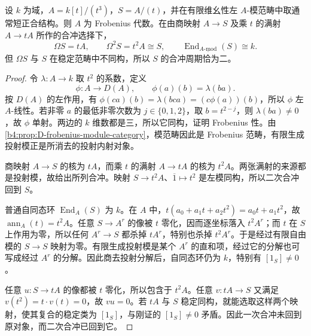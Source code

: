 \begin{proposition}\label{b4:prop:D-truncated-cubic-period}
	设 \(k\) 为域，\(A=k[t]/(t^3)\)，\(S=A/(t)\)，并在有限维幺性左 \(A\)-模范畴中取通常短正合结构。则 \(A\) 为 Frobenius 代数。在由商映射 \(A\to S\) 及乘 \(t\) 的满射 \(A\to tA\) 所作的合冲选择下，
	\[
		\Omega S=tA,\qquad \Omega^2S=t^2A\cong S, \qquad \operatorname{End}_{\underline{A\text{-}\mathrm{mod}}}(S)\cong k.
	\]
	但 \(\Omega S\) 与 \(S\) 在稳定范畴中不同构，所以 \(S\) 的合冲周期恰为二。
\end{proposition}
\begin{proof}
	令 \(\lambda:A\to k\) 取 \(t^2\) 的系数，定义
	\[
		\phi:A\longrightarrow D(A),\qquad \phi(a)(b)=\lambda(ba).
	\]
	按 \(D(A)\) 的左作用，有 \(\phi(ca)(b)=\lambda(bca)=(c\phi(a))(b)\)，所以 \(\phi\) 左 \(A\)-线性。若非零 \(a\) 的最低非零次数为 \(j\in\{0,1,2\}\)，取 \(b=t^{2-j}\)，则 \(\lambda(ba)\ne0\)，故 \(\phi\) 单射。两边的 \(k\) 维数都是三，所以它同构，证明 Frobenius 性。由\cref{b4:prop:D-frobenius-module-category}，模范畴因此是 Frobenius 范畴，有限生成投射模正是所消去的投射内射对象。

	商映射 \(A\to S\) 的核为 \(tA\)，而乘 \(t\) 的满射 \(A\to tA\) 的核为 \(t^2A\)。两张满射的来源都是投射模，故给出所列合冲。映射 \(S\to t^2A\)、\(\overline1\mapsto t^2\) 是左模同构，所以二次合冲回到 \(S\)。

	普通自同态环 \(\operatorname{End}_A(S)\) 为 \(k\)。在 \(A\) 中，\(t(a_0+a_1t+a_2t^2)=a_0t+a_1t^2\)，故 \(\operatorname{ann}_A(t)=t^2A\)。任意 \(S\to A^r\) 的像被 \(t\) 零化，因而逐坐标落入 \(t^2A^r\)；而 \(t\) 在 \(S\) 上作用为零，所以任何 \(A^r\to S\) 都杀掉 \(tA^r\)，特别也杀掉 \(t^2A^r\)。于是经过有限自由模的 \(S\to S\) 映射为零。有限生成投射模是某个 \(A^r\) 的直和项，经过它的分解也可写成经过 \(A^r\) 的分解。因此商去投射分解后，自同态环仍为 \(k\)，特别有 \([1_S]\ne0\)。

	任意 \(u:S\to tA\) 的像都被 \(t\) 零化，所以包含于 \(t^2A\)。任意 \(v:tA\to S\) 又满足 \(v(t^2)=t\cdot v(t)=0\)，故 \(vu=0\)。若 \(tA\) 与 \(S\) 稳定同构，就能选取这样两个映射，使其复合的稳定类为 \([1_S]\)，与刚证的 \([1_S]\ne0\) 矛盾。因此一次合冲未回到原对象，而二次合冲已回到它。
\end{proof}
